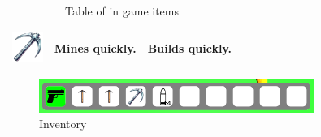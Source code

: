 \begin{table}[h]
\begin{tabular}{|c|p{5cm}|p{5cm}|}
        \hline
        \includegraphics[width=1cm]{chapters/user_manual/resources/pickaxe-fast.png} & Mines quickly.                                                                        & Builds quickly.     \\
        \hline
    \end{tabular}
    \caption{Table of in game items}
    \label{tab:mytable}
\end{table}

\begin{figure}[H]
    \centering
    \includegraphics[width=0.8\textwidth]{chapters/user_manual/resources/inventory.png}
    \caption{Inventory}
    \label{fig:inventory}
\end{figure}